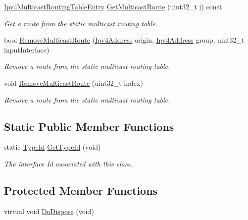 \begin{DoxyCompactItemize}
\hyperlink{classns3_1_1Ipv4MulticastRoutingTableEntry}{Ipv4\+Multicast\+Routing\+Table\+Entry} \hyperlink{classns3_1_1Ipv4StaticRouting_ad98dc9192a4fc144074fac4f5b857658}{Get\+Multicast\+Route} (uint32\+\_\+t \hyperlink{lte__uplink__power__control_8m_a6f6ccfcf58b31cb6412107d9d5281426}{i}) const 
\begin{DoxyCompactList}\small\item\em Get a route from the static multicast routing table. \end{DoxyCompactList}\item 
bool \hyperlink{classns3_1_1Ipv4StaticRouting_afca7bca35c67739be3ee551baaeda4ef}{Remove\+Multicast\+Route} (\hyperlink{classns3_1_1Ipv4Address}{Ipv4\+Address} origin, \hyperlink{classns3_1_1Ipv4Address}{Ipv4\+Address} group, uint32\+\_\+t input\+Interface)
\begin{DoxyCompactList}\small\item\em Remove a route from the static multicast routing table. \end{DoxyCompactList}\item 
void \hyperlink{classns3_1_1Ipv4StaticRouting_a6f530f68b04bcd8bdadec6c41759643c}{Remove\+Multicast\+Route} (uint32\+\_\+t index)
\begin{DoxyCompactList}\small\item\em Remove a route from the static multicast routing table. \end{DoxyCompactList}\end{DoxyCompactItemize}
\subsection*{Static Public Member Functions}
\begin{DoxyCompactItemize}
\item 
static \hyperlink{classns3_1_1TypeId}{Type\+Id} \hyperlink{classns3_1_1Ipv4StaticRouting_ae81d892774266a25710d1031d0e422eb}{Get\+Type\+Id} (void)
\begin{DoxyCompactList}\small\item\em The interface Id associated with this class. \end{DoxyCompactList}\end{DoxyCompactItemize}
\subsection*{Protected Member Functions}
\begin{DoxyCompactItemize}
\item 
virtual void \hyperlink{classns3_1_1Ipv4StaticRouting_a54fac8e7b55b72baaa54d94ed98cf9a1}{Do\+Dispose} (void)
\end{DoxyCompactItemize}
